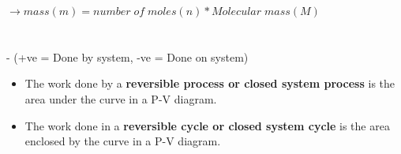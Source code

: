 \documentclass[8pt]{article}
\begin{document}
$\rightarrow \boxed{mass(m) = number\;of\;moles(n) * Molecular\;mass(M)}$\\\hrulefill\\
\\ - (+ve = Done by system, -ve = Done on system)
	\begin{itemize}
		\item The work done by a \textbf{reversible process or closed system process} is the area under the curve in a P-V diagram.
		\item The work done in a \textbf{reversible cycle or closed system cycle}    is the area enclosed by the curve in a P-V diagram.
	\end{itemize}
	\hrulefill\\
\\
\end{document}
